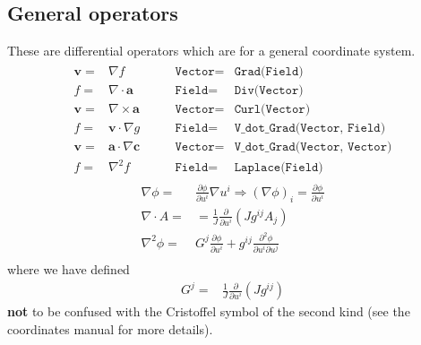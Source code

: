 \documentclass[12pt]{article}
\newcommand{\code}[1]{\texttt{#1}}
\newcommand{\deriv}[2]{\ensuremath{\frac{\partial #1}{\partial #2}}}
\begin{document}
\subsection{General operators}
%
These are differential operators which are for a general coordinate system.
%
\begin{align}
%
\begin{array}{rclrcl}
\mathbf{v} =& \nabla f &\qquad \code{Vector} =& \code{Grad(Field)} \\
f =& \nabla\cdot\mathbf{a} &\qquad \code{Field} =& \code{Div(Vector)} \\
\mathbf{v} =& \nabla\times\mathbf{a} &\qquad \code{Vector} =& 
\code{Curl(Vector)} \\
f =& \mathbf{v}\cdot\nabla g &\qquad \code{Field} =& \code{V\_dot\_Grad(Vector, 
Field)} \\
\mathbf{v} =& \mathbf{a}\cdot\nabla\mathbf{c} &\qquad \code{Vector} =&
\code{V\_dot\_Grad(Vector, Vector)} \\
f =& \nabla^2 f &\qquad \code{Field} =& \code{Laplace(Field)}
\end{array}
%
\end{align}
%
\begin{align*}
\nabla\phi =& \deriv{\phi}{u^i}\nabla u^i \Rightarrow \left(\nabla\phi\right)_i
    = \deriv{\phi}{u^i} \\ \nabla\cdot A =& =
    \frac{1}{J}\deriv{}{u^i}\left(Jg^{ij}A_j\right) \\ \nabla^2\phi =&
    G^j\deriv{\phi}{u^i} + g^{ij}\frac{\partial^2\phi}{\partial
    u^i\partial u^j} \\
\end{align*}
%
where we have defined
%
\begin{align*}
G^j =& \frac{1}{J}\deriv{}{u^i}\left(Jg^{ij}\right)
\end{align*}
%
\textbf{not} to be confused with the Cristoffel symbol of the second kind (see 
the coordinates manual for more details).
%
\end{document}
